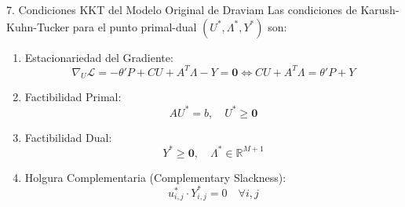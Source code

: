 \documentclass[aspectratio=169,10pt]{beamer}
\begin{document}
\begin{frame}{7. Condiciones KKT del Modelo Original de Draviam}
  Las condiciones de Karush-Kuhn-Tucker para el punto primal-dual $(U^*, \Lambda^*, Y^*)$ son:
  \vspace{0.15cm}
  \begin{enumerate}
    \item Estacionariedad del Gradiente:
    \begin{equation*}
      \nabla_U \mathcal{L} = -\theta' P + C U + A^T \Lambda - Y = \mathbf{0} \iff C U + A^T \Lambda = \theta' P + Y
    \end{equation*}
    \vspace{0.1cm}
    \item Factibilidad Primal:
    \begin{equation*}
      A U^* = b, \quad U^* \ge \mathbf{0}
    \end{equation*}
    \vspace{0.1cm}
    \item Factibilidad Dual:
    \begin{equation*}
      Y^* \ge \mathbf{0}, \quad \Lambda^* \in \mathbb{R}^{M+1}
    \end{equation*}
    \vspace{0.1cm}
    \item Holgura Complementaria (Complementary Slackness):
    \begin{equation*}
      u_{i,j}^* \cdot Y_{i,j}^* = 0 \quad \forall i, j
    \end{equation*}
  \end{enumerate}
\end{frame}
\end{document}
